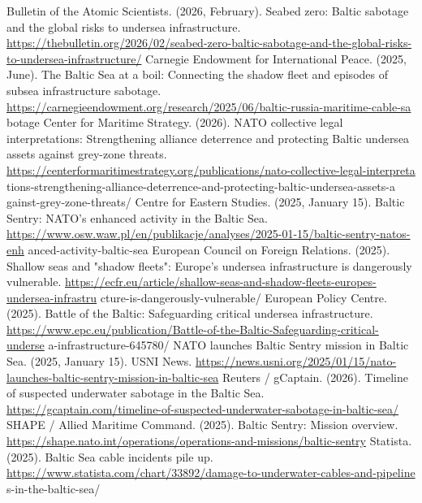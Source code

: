 
\begin{referencelist}
   Bulletin of the Atomic Scientists. (2026, February). Seabed zero: Baltic sabotage and the global risks to undersea infrastructure. \url{https://thebulletin.org/2026/02/seabed-zero-baltic-sabotage-and-the-global-risks-to-undersea-infrastructure/}
   Carnegie Endowment for International Peace. (2025, June). The Baltic Sea at a boil: Connecting the shadow fleet and episodes of subsea infrastructure sabotage. \url{https://carnegieendowment.org/research/2025/06/baltic-russia-maritime-cable-sa} botage
   Center for Maritime Strategy. (2026). NATO collective legal interpretations: Strengthening alliance deterrence and protecting Baltic undersea assets against grey-zone threats. \url{https://centerformaritimestrategy.org/publications/nato-collective-legal-interpreta} tions-strengthening-alliance-deterrence-and-protecting-baltic-undersea-assets-a gainst-grey-zone-threats/
   Centre for Eastern Studies. (2025, January 15). Baltic Sentry: NATO's enhanced activity in the Baltic Sea. \url{https://www.osw.waw.pl/en/publikacje/analyses/2025-01-15/baltic-sentry-natos-enh} anced-activity-baltic-sea
   European Council on Foreign Relations. (2025). Shallow seas and "shadow fleets": Europe's undersea infrastructure is dangerously vulnerable. \url{https://ecfr.eu/article/shallow-seas-and-shadow-fleets-europes-undersea-infrastru} cture-is-dangerously-vulnerable/
   European Policy Centre. (2025). Battle of the Baltic: Safeguarding critical undersea infrastructure. \url{https://www.epc.eu/publication/Battle-of-the-Baltic-Safeguarding-critical-underse} a-infrastructure-645780/
   NATO launches Baltic Sentry mission in Baltic Sea. (2025, January 15). USNI News. \url{https://news.usni.org/2025/01/15/nato-launches-baltic-sentry-mission-in-baltic-sea}
   Reuters / gCaptain. (2026). Timeline of suspected underwater sabotage in the Baltic Sea. \url{https://gcaptain.com/timeline-of-suspected-underwater-sabotage-in-baltic-sea/}
   SHAPE / Allied Maritime Command. (2025). Baltic Sentry: Mission overview. \url{https://shape.nato.int/operations/operations-and-missions/baltic-sentry}
   Statista. (2025). Baltic Sea cable incidents pile up. \url{https://www.statista.com/chart/33892/damage-to-underwater-cables-and-pipeline} s-in-the-baltic-sea/
\end{referencelist}
